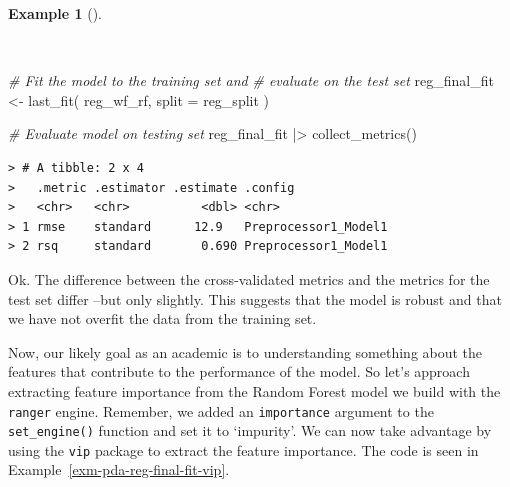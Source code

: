 \documentclass[
  letterpaper,
]{latex/krantz}
\newenvironment{Shaded}{\begin{snugshade}}{\end{snugshade}}
\newcommand{\AttributeTok}[1]{\textcolor[rgb]{0.00,0.00,0.00}{#1}}
\newcommand{\CommentTok}[1]{\textcolor[rgb]{0.00,0.00,0.00}{\textit{#1}}}
\newcommand{\FunctionTok}[1]{\textcolor[rgb]{0.00,0.00,0.00}{#1}}
\newcommand{\NormalTok}[1]{\textcolor[rgb]{0.00,0.00,0.00}{#1}}
\newcommand{\OtherTok}[1]{\textcolor[rgb]{0.00,0.00,0.00}{#1}}
\newcommand{\SpecialCharTok}[1]{\textcolor[rgb]{0.00,0.00,0.00}{#1}}
\theoremstyle{definition}
\newtheorem{example}{Example}[chapter]
\theoremstyle{remark}
\begin{document}
\begin{example}[]\protect\hypertarget{exm-pda-reg-model-spec-random-forest-workflow-tune-fit}{}\label{exm-pda-reg-model-spec-random-forest-workflow-tune-fit}

~

\begin{Shaded}
\begin{Highlighting}[]
\CommentTok{\# Fit the model to the training set and}
\CommentTok{\# evaluate on the test set}
\NormalTok{reg\_final\_fit }\OtherTok{\textless{}{-}}
  \FunctionTok{last\_fit}\NormalTok{(}
\NormalTok{    reg\_wf\_rf,}
    \AttributeTok{split =}\NormalTok{ reg\_split}
\NormalTok{  )}

\CommentTok{\# Evaluate model on testing set}
\NormalTok{reg\_final\_fit }\SpecialCharTok{|\textgreater{}} \FunctionTok{collect\_metrics}\NormalTok{()}
\end{Highlighting}
\end{Shaded}

\begin{verbatim}
> # A tibble: 2 x 4
>   .metric .estimator .estimate .config             
>   <chr>   <chr>          <dbl> <chr>               
> 1 rmse    standard      12.9   Preprocessor1_Model1
> 2 rsq     standard       0.690 Preprocessor1_Model1
\end{verbatim}

\end{example}

Ok. The difference between the cross-validated metrics and the metrics
for the test set differ --but only slightly. This suggests that the
model is robust and that we have not overfit the data from the training
set.

Now, our likely goal as an academic is to understanding something about
the features that contribute to the performance of the model. So let's
approach extracting feature importance from the Random Forest model we
build with the \texttt{ranger} engine. Remember, we added an
\texttt{importance} argument to the \texttt{set\_engine()} function and
set it to `impurity'. We can now take advantage by using the
\texttt{vip} package to extract the feature importance. The code is seen
in Example~\ref{exm-pda-reg-final-fit-vip}.
\end{document}
